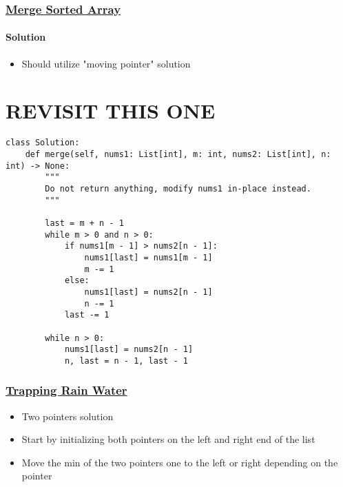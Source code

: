 \documentclass{article}
\begin{document}
\subsection{\href{https://leetcode.com/problems/merge-sorted-array/?envType=company&envId=amazon&favoriteSlug=amazon-thirty-days}{Merge Sorted Array}}

\subsubsection{Solution}
\begin{itemize}
\item Should utilize "moving pointer" solution
\end{itemize}

\chapter{REVISIT THIS ONE}

\begin{lstlisting}
class Solution:
    def merge(self, nums1: List[int], m: int, nums2: List[int], n: int) -> None:
        """
        Do not return anything, modify nums1 in-place instead.
        """
        
        last = m + n - 1
        while m > 0 and n > 0:
            if nums1[m - 1] > nums2[n - 1]:
                nums1[last] = nums1[m - 1]
                m -= 1
            else:
                nums1[last] = nums2[n - 1]
                n -= 1
            last -= 1
        
        while n > 0:
            nums1[last] = nums2[n - 1]
            n, last = n - 1, last - 1
\end{lstlisting}

\subsection{\href{https://leetcode.com/problems/trapping-rain-water/?envType=company&envId=amazon&favoriteSlug=amazon-thirty-days}{Trapping Rain Water}}

\begin{itemize}
\item Two pointers solution
\item Start by initializing both pointers on the left and right end of the list
\item Move the min of the two pointers one to the left or right depending on the pointer
\end{itemize}
\end{document}
